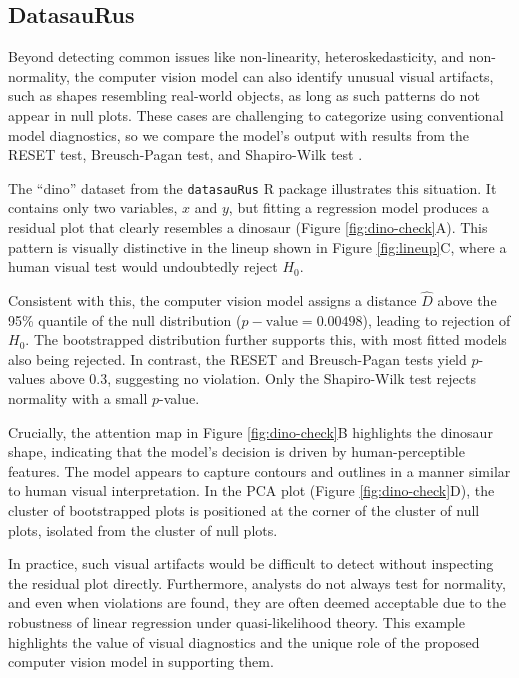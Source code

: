 \documentclass[]{interact}
\theoremstyle{plain}%
\theoremstyle{definition}
\theoremstyle{remark}
\begin{document}
\subsection{DatasauRus}\label{datasaurus}

Beyond detecting common issues like non-linearity, heteroskedasticity,
and non-normality, the computer vision model can also identify unusual
visual artifacts, such as shapes resembling real-world objects, as long
as such patterns do not appear in null plots. These cases are
challenging to categorize using conventional model diagnostics, so we
compare the model's output with results from the RESET test,
Breusch-Pagan test, and Shapiro-Wilk test \citep{shapiro1965analysis}.

The ``dino'' dataset from the \texttt{datasauRus} R package illustrates
this situation. It contains only two variables, \(x\) and \(y\), but
fitting a regression model produces a residual plot that clearly
resembles a dinosaur (Figure \ref{fig:dino-check}A). This pattern is
visually distinctive in the lineup shown in Figure \ref{fig:lineup}C,
where a human visual test would undoubtedly reject \(H_0\).

Consistent with this, the computer vision model assigns a distance
\(\hat{D}\) above the 95\% quantile of the null distribution
(\(p-\text{value} = 0.00498\)), leading to rejection of \(H_0\). The
bootstrapped distribution further supports this, with most fitted models
also being rejected. In contrast, the RESET and Breusch-Pagan tests
yield \(p\)-values above \(0.3\), suggesting no violation. Only the
Shapiro-Wilk test rejects normality with a small \(p\)-value.

Crucially, the attention map in Figure \ref{fig:dino-check}B highlights
the dinosaur shape, indicating that the model's decision is driven by
human-perceptible features. The model appears to capture contours and
outlines in a manner similar to human visual interpretation. In the PCA
plot (Figure \ref{fig:dino-check}D), the cluster of bootstrapped plots
is positioned at the corner of the cluster of null plots, isolated from
the cluster of null plots.

In practice, such visual artifacts would be difficult to detect without
inspecting the residual plot directly. Furthermore, analysts do not
always test for normality, and even when violations are found, they are
often deemed acceptable due to the robustness of linear regression under
quasi-likelihood theory. This example highlights the value of visual
diagnostics and the unique role of the proposed computer vision model in
supporting them.
\end{document}
